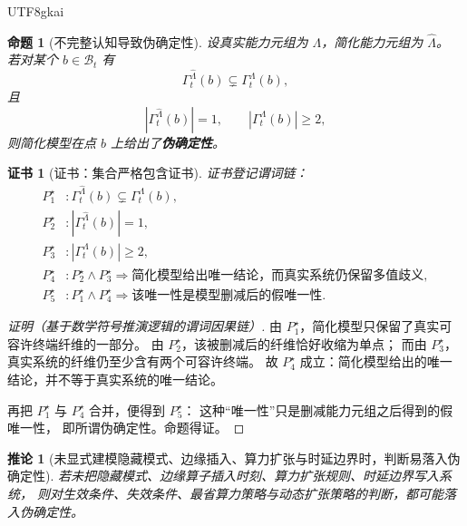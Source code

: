 \documentclass[12pt]{article}
\newtheorem{proposition}{命题}[section]
\newtheorem{corollary}{推论}[section]
\newtheorem{Certificate}{证书}[section]
\begin{document}
\begin{CJK*}{UTF8}{gkai}
\begin{proposition}[不完整认知导致伪确定性]
\label{prop:tex1-ch2-pseudo-determinacy}
设真实能力元组为 $\Lambda$，简化能力元组为 $\widehat\Lambda$。
若对某个 $b\in\mathcal B_t$ 有
\[
  \Gamma_t^{\widehat\Lambda}(b)\subsetneq \Gamma_t^{\Lambda}(b),
\]
且
\[
  |\Gamma_t^{\widehat\Lambda}(b)|=1,
  \qquad
  |\Gamma_t^{\Lambda}(b)|\ge 2,
\]
则简化模型在点 $b$ 上给出了\textbf{伪确定性}。
\end{proposition}

\begin{Certificate}[证书：集合严格包含证书]
\label{cert:tex1-ch2-pseudo-determinacy}
证书登记谓词链：
\[
\begin{aligned}
  P^\star_1 &: \Gamma_t^{\widehat\Lambda}(b)\subsetneq \Gamma_t^{\Lambda}(b),\\
  P^\star_2 &: |\Gamma_t^{\widehat\Lambda}(b)|=1,\\
  P^\star_3 &: |\Gamma_t^{\Lambda}(b)|\ge 2,\\
  P^\star_4 &: P^\star_2\wedge P^\star_3\Rightarrow
               \text{简化模型给出唯一结论，而真实系统仍保留多值歧义},\\
  P^\star_5 &: P^\star_1\wedge P^\star_4\Rightarrow \text{该唯一性是模型删减后的假唯一性}.
\end{aligned}
\]
\end{Certificate}

\begin{proof}[证明（基于数学符号推演逻辑的谓词因果链）]
由 \(P^\star_1\)，简化模型只保留了真实可容许终端纤维的一部分。
由 \(P^\star_2\)，该被删减后的纤维恰好收缩为单点；
而由 \(P^\star_3\)，真实系统的纤维仍至少含有两个可容许终端。
故 \(P^\star_4\) 成立：简化模型给出的唯一结论，并不等于真实系统的唯一结论。

再把 \(P^\star_1\) 与 \(P^\star_4\) 合并，便得到 \(P^\star_5\)：
这种“唯一性”只是删减能力元组之后得到的假唯一性，
即所谓伪确定性。命题得证。
\end{proof}

\begin{corollary}[未显式建模隐藏模式、边缘插入、算力扩张与时延边界时，判断易落入伪确定性]
\label{cor:tex1-ch2-pseudo-determinacy}
若未把隐藏模式、边缘算子插入时刻、算力扩张规则、时延边界写入系统，
则对生效条件、失效条件、最省算力策略与动态扩张策略的判断，都可能落入伪确定性。
\end{corollary}


\end{CJK*}
\end{document}
